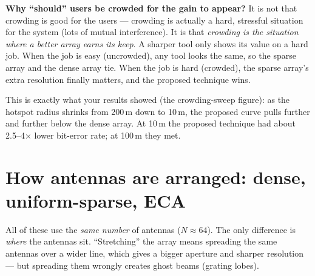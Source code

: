 \documentclass[11pt]{article}
\begin{document}
\begin{keybox}
\textbf{Why ``should'' users be crowded for the gain to appear?} It is not that crowding is good
for the users --- crowding is actually a hard, stressful situation for the system (lots of mutual
interference). It is that \emph{crowding is the situation where a better array earns its keep}. A
sharper tool only shows its value on a hard job. When the job is easy (uncrowded), any tool looks
the same, so the sparse array and the dense array tie. When the job is hard (crowded), the sparse
array's extra resolution finally matters, and the proposed technique wins.
\end{keybox}

This is exactly what your results showed (the crowding-sweep figure): as the hotspot radius
shrinks from 200\,m down to 10\,m, the proposed curve pulls further and further below the dense
array. At 10\,m the proposed technique had about 2.5--4$\times$ lower bit-error rate; at 100\,m
they met.

\section{How antennas are arranged: dense, uniform-sparse, ECA}

All of these use the \emph{same number} of antennas ($N\approx64$). The only difference is
\emph{where} the antennas sit. ``Stretching'' the array means spreading the same antennas over a
wider line, which gives a bigger aperture and sharper resolution --- but spreading them wrongly
creates ghost beams (grating lobes).

\begin{center}
\end{center}
\end{document}
